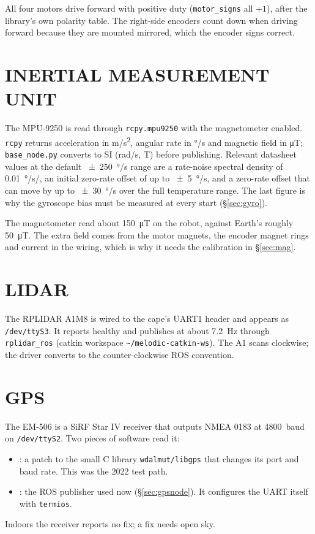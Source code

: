 All four motors drive forward with positive duty (\texttt{motor\_signs} all
$+1$), after the library's own polarity table. The right-side encoders count
down when driving forward because they are mounted mirrored, which the
encoder signs correct.

\section{INERTIAL MEASUREMENT UNIT}

The MPU-9250 is read through \texttt{rcpy.mpu9250} with the magnetometer
enabled. \texttt{rcpy} returns acceleration in \si{m/s^2}, angular rate in
\si{\degree/s} and magnetic field in \si{\micro T}; \texttt{base\_node.py}
converts to SI (\si{rad/s}, \si{T}) before publishing. Relevant datasheet
values at the default \SI{\pm250}{\degree/s} range are a rate-noise spectral
density of \SI{0.01}{\degree/s/}, an initial zero-rate offset of up to
\SI{\pm5}{\degree/s}, and a zero-rate offset that can move by up to
\SI{\pm30}{\degree/s} over the full temperature range. The last figure is why
the gyroscope bias must be measured at every start (\S\ref{sec:gyro}).

The magnetometer read about \SI{150}{\micro T} on the robot, against Earth's
roughly \SI{50}{\micro T}. The extra field comes from the motor magnets,
the encoder magnet rings and current in the wiring, which is why it needs the
calibration in \S\ref{sec:mag}.

\section{LIDAR}

The RPLIDAR A1M8 is wired to the cape's UART1 header and appears as
\texttt{/dev/ttyS3}. It reports healthy and publishes  at about
\SI{7.2}{Hz} through \texttt{rplidar\_ros} (catkin workspace
\texttt{\textasciitilde/melodic-catkin-ws}). The A1 scans clockwise; the
driver converts to the counter-clockwise ROS convention.

\section{GPS}

The EM-506 is a SiRF Star IV receiver that outputs NMEA 0183 at
\SI{4800}{baud} on \texttt{/dev/ttyS2}. Two pieces of software read it:
\begin{itemize}
\item {}: a patch to the small C library
  \texttt{wdalmut/libgps} that changes its port and baud rate. This was the
  2022 test path.
\item {}: the ROS publisher used now
  (\S\ref{sec:gpsnode}). It configures the UART itself with \texttt{termios}.
\end{itemize}
Indoors the receiver reports no fix; a fix needs open sky.

